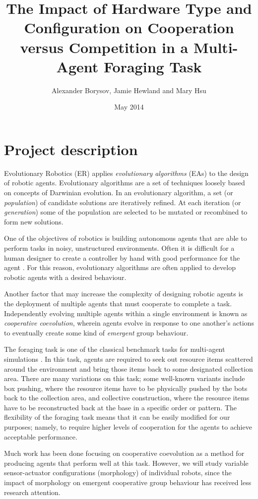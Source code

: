\documentclass[a4paper,12pt]{article}
\title{The Impact of Hardware Type and Configuration on Cooperation versus Competition in a Multi-Agent Foraging Task}
\author{Alexander Borysov, Jamie Hewland and Mary Hsu}
\date{May 2014}
\begin{document}
\maketitle

\section{Project description}
Evolutionary Robotics (ER) applies \emph{evolutionary algorithms} (EAs) to the design of robotic agents. Evolutionary algorithms are a set of techniques loosely based on concepts of Darwinian evolution. In an evolutionary algorithm, a set (or \emph{population}) of candidate solutions are iteratively refined. At each iteration (or \emph{generation}) some of the population are selected to be mutated or recombined to form new solutions.

One of the objectives of robotics is building autonomous agents that are able to perform tasks in noisy, unstructured environments. Often it is difficult for a human designer to create a controller by hand with good performance for the agent \cite{Nolfi94}. For this reason, evolutionary algorithms are often applied to develop robotic agents with a desired behaviour.

Another factor that may increase the complexity of designing robotic agents is the deployment of multiple agents that must cooperate to complete a task. Independently evolving multiple agents within a single environment is known as \emph{cooperative coevolution}, wherein agents evolve in response to one another’s actions to eventually create some kind of \emph{emergent} group behaviour.

The foraging task is one of the classical benchmark tasks for multi-agent simulations \cite{Ostergaard01}. In this task, agents are required to seek out resource items scattered around the environment and bring those items back to some designated collection area. There are many variations on this task; some well-known variants include box pushing, where the resource items have to be physically pushed by the bots back to the collection area, and collective construction, where the resource items have to be reconstructed back at the base in a specific order or pattern. The flexibility of the foraging task means that it can be easily modified for our purposes; namely, to require higher levels of cooperation for the agents to achieve acceptable performance.

Much work has been done focusing on cooperative coevolution as a method for producing agents that perform well at this task. However, we will study variable sensor-actuator configurations (morphology) of individual robots, since the impact of morphology on emergent cooperative group behaviour has received less research attention.
\end{document}
